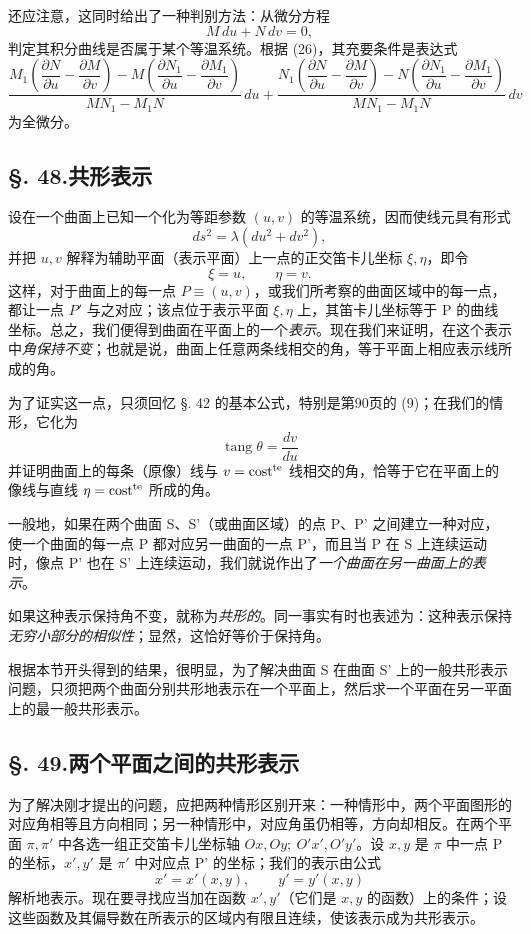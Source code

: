 还应注意，这同时给出了一种判别方法：从微分方程
\[
 M\,du+N\,dv=0,
\]
判定其积分曲线是否属于某个等温系统。根据 (26)，其充要条件是表达式
\[
\frac{M_1\left(\dfrac{\partial N}{\partial u}-\dfrac{\partial M}{\partial v}\right)-M\left(\dfrac{\partial N_1}{\partial u}-\dfrac{\partial M_1}{\partial v}\right)}{MN_1-M_1N}\,du+
\frac{N_1\left(\dfrac{\partial N}{\partial u}-\dfrac{\partial M}{\partial v}\right)-N\left(\dfrac{\partial N_1}{\partial u}-\dfrac{\partial M_1}{\partial v}\right)}{MN_1-M_1N}\,dv
\]
为全微分。

\subsection*{\S. 48.\quad 共形表示}

设在一个曲面上已知一个化为等距参数 \((u,v)\) 的等温系统，因而使线元具有形式
\[
 ds^2=\lambda(du^2+dv^2),
\]
并把 \(u,v\) 解释为辅助平面（表示平面）上一点的正交笛卡儿坐标 \(\xi,\eta\)，即令
\[
 \xi=u,
 \qquad
 \eta=v.
\]
这样，对于曲面上的每一点 \(P\equiv(u,v)\)，或我们所考察的曲面区域中的每一点，都让一点 \(P'\) 与之对应；该点位于表示平面 \(\xi,\eta\) 上，其笛卡儿坐标等于 P 的曲线坐标。总之，我们便得到曲面在平面上的一个\emph{表示}。现在我们来证明，在这个表示中\emph{角保持不变}；也就是说，曲面上任意两条线相交的角，等于平面上相应表示线所成的角。

为了证实这一点，只须回忆 \S. 42 的基本公式，特别是第90页的 (9)；在我们的情形，它化为
\[
 \operatorname{tang}\theta=\frac{dv}{du}
\]
并证明曲面上的每条（原像）线与 \(v=\mathrm{cost}^{\mathrm{te}}\) 线相交的角，恰等于它在平面上的像线与直线 \(\eta=\mathrm{cost}^{\mathrm{te}}\) 所成的角。

一般地，如果在两个曲面 S、S'（或曲面区域）的点 P、P' 之间建立一种对应，使一个曲面的每一点 P 都对应另一曲面的一点 P'，而且当 P 在 S 上连续运动时，像点 P' 也在 S' 上连续运动，我们就说作出了\emph{一个曲面在另一曲面上的表示}。

如果这种表示保持角不变，就称为\emph{共形的}。同一事实有时也表述为：这种表示保持\emph{无穷小部分的相似性}；显然，这恰好等价于保持角。

根据本节开头得到的结果，很明显，为了解决曲面 S 在曲面 S' 上的一般共形表示问题，只须把两个曲面分别共形地表示在一个平面上，然后求一个平面在另一平面上的最一般共形表示。

\subsection*{\S. 49.\quad 两个平面之间的共形表示}

为了解决刚才提出的问题，应把两种情形区别开来：一种情形中，两个平面图形的对应角相等且方向相同；另一种情形中，对应角虽仍相等，方向却相反。在两个平面 \(\pi,\pi'\) 中各选一组正交笛卡儿坐标轴 \(Ox,Oy;\ O'x',O'y'\)。设 \(x,y\) 是 \(\pi\) 中一点 P 的坐标，\(x',y'\) 是 \(\pi'\) 中对应点 P' 的坐标；我们的表示由公式
\[
 x'=x'(x,y),
 \qquad
 y'=y'(x,y)
\]
解析地表示。现在要寻找应当加在函数 \(x',y'\)（它们是 \(x,y\) 的函数）上的条件；设这些函数及其偏导数在所表示的区域内有限且连续，使该表示成为共形表示。

